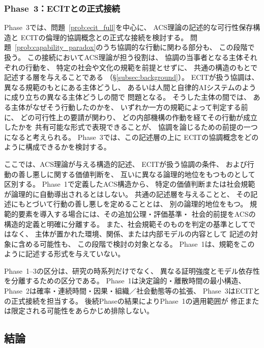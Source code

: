 \subsubsection*{Phase~3：ECITとの正式接続}
\label{subsubsec:phase3}

Phase~3では、問題~\ref{prob:ecit_full}を中心に、
ACS理論の記述的な可行性保存構造と
ECITの倫理的協調概念との正式な接続を検討する。
問題~\ref{prob:capability_paradox}のうち協調的な行動に関わる部分も、
この段階で扱う。
この接続においてACS理論が担う役割は、
協調の当事者となる主体それぞれの行動を、
特定の社会や文化の規範を前提とせずに、
共通の構造のもとで記述する層を与えることである
（\S\ref{subsec:background}）。
ECITが扱う協調は、
異なる規範のもとにある主体どうし、
あるいは人間と自律的AIシステムのように成り立ちの異なる主体どうしの間で
問題となる。
そうした主体の間では、
ある主体がなぜそう行動したのかを、
いずれか一方の規範によって判定する前に、
どの可行性上の要請が関わり、
どの内部機構の作動を経てその行動が成立したかを
共有可能な形式で表現できることが、
協調を論じるための前提の一つになると考えられる。
Phase~3では、この記述層の上に
ECITの協調概念をどのように構成できるかを検討する。

ここでは、ACS理論が与える構造的記述、
ECITが扱う協調の条件、
および行動の善し悪しに関する価値判断を、
互いに異なる論理的地位をもつものとして区別する。
Phase~1で定義したACS構造から、
特定の価値判断または社会規範が論理的に自動導出されるとはしない。
共通の記述層を与えることと、
その記述にもとづいて行動の善し悪しを定めることとは、
別の論理的地位をもつ。
規範的要素を導入する場合には、その追加公理・評価基準・
社会的前提をACSの構造的定義と明確に分離する。
また、社会規範そのものを判定の基準としてではなく、
主体が置かれた環境、関係、または内部モデルの内容として
記述の対象に含める可能性も、
この段階で検討の対象となる。
Phase~1は、規範をこのように記述する形式を与えていない。

\begin{remark}[Phase区分の研究戦略的意義]
\label{rem:phase_strategy}
Phase~1--3の区分は、研究の時系列だけでなく、
異なる証明強度とモデル依存性を分離するための区分である。
Phase~1は決定論的・離散時間の最小構造、
Phase~2は確率・連続時間・因果・組織／社会動態等の拡張、
Phase~3はECITとの正式接続を担当する。
後続Phaseの結果によりPhase~1の適用範囲が
修正または限定される可能性をあらかじめ排除しない。
\end{remark}

\subsection{結論}
\label{subsec:conclusion}

